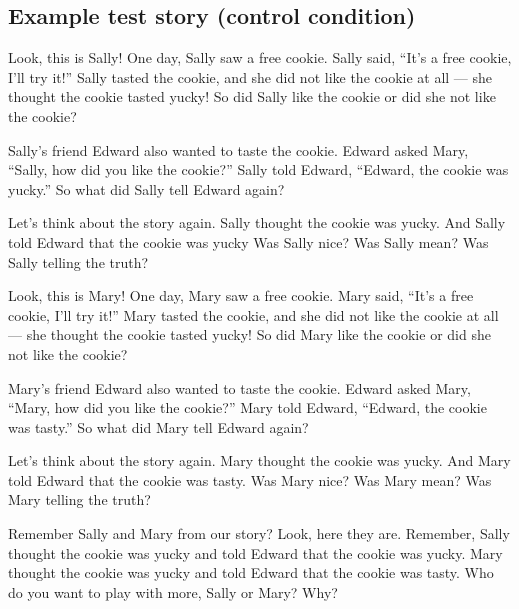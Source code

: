 \documentclass[oneside]{report}
\begin{document}
\subsection{Example test story (control
condition)}\label{example-test-story-control-condition}

Look, this is Sally! One day, Sally saw a free cookie. Sally said,
``It's a free cookie, I'll try it!'' Sally tasted the cookie, and she
did not like the cookie at all --- she thought the cookie tasted yucky!
So did Sally like the cookie or did she not like the cookie?

Sally's friend Edward also wanted to taste the cookie. Edward asked
Mary, ``Sally, how did you like the cookie?'' Sally told Edward,
``Edward, the cookie was yucky.'' So what did Sally tell Edward again?

Let's think about the story again. Sally thought the cookie was yucky.
And Sally told Edward that the cookie was yucky Was Sally nice? Was
Sally mean? Was Sally telling the truth?

Look, this is Mary! One day, Mary saw a free cookie. Mary said, ``It's a
free cookie, I'll try it!'' Mary tasted the cookie, and she did not like
the cookie at all --- she thought the cookie tasted yucky! So did Mary
like the cookie or did she not like the cookie?

Mary's friend Edward also wanted to taste the cookie. Edward asked Mary,
``Mary, how did you like the cookie?'' Mary told Edward, ``Edward, the
cookie was tasty.'' So what did Mary tell Edward again?

Let's think about the story again. Mary thought the cookie was yucky.
And Mary told Edward that the cookie was tasty. Was Mary nice? Was Mary
mean? Was Mary telling the truth?

Remember Sally and Mary from our story? Look, here they are. Remember,
Sally thought the cookie was yucky and told Edward that the cookie was
yucky. Mary thought the cookie was yucky and told Edward that the cookie
was tasty. Who do you want to play with more, Sally or Mary? Why?
\end{document}
